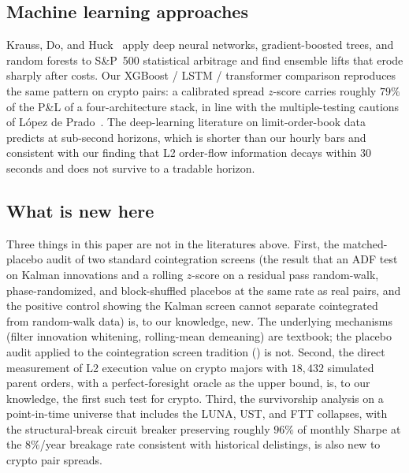\documentclass[11pt]{article}
\begin{document}
\subsection{Machine learning approaches}
\label{sec:related-ml}

Krauss, Do, and Huck~\cite{krauss2017deep} apply deep neural networks, gradient-boosted
trees, and random forests to S\&P~500 statistical arbitrage and find ensemble lifts that
erode sharply after costs. Our XGBoost / LSTM / transformer comparison reproduces the same
pattern on crypto pairs: a calibrated spread $z$-score carries roughly $79\%$ of the P\&L of
a four-architecture stack, in line with the multiple-testing cautions of L\'opez de
Prado~\cite{lopezdeprado2018advances}. The deep-learning literature on limit-order-book
data predicts at sub-second horizons, which is shorter than our hourly bars and consistent
with our finding that L2 order-flow information decays within $30$ seconds and does not
survive to a tradable horizon.

\subsection{What is new here}
\label{sec:related-novelty}

Three things in this paper are not in the literatures above. First, the matched-placebo
audit of two standard cointegration screens (the result that an ADF test on Kalman
innovations and a rolling $z$-score on a residual pass random-walk, phase-randomized, and
block-shuffled placebos at the same rate as real pairs, and the positive control showing
the Kalman screen cannot separate cointegrated from random-walk data) is, to our
knowledge, new. The underlying mechanisms (filter innovation whitening, rolling-mean
demeaning) are textbook; the placebo audit applied to the cointegration screen tradition
(\cite{vidyamurthy2004pairs, elliott2005pairs, triantafyllopoulos2011dynamic}) is not.
Second, the direct measurement of L2 execution value on crypto majors with $18{,}432$
simulated parent orders, with a perfect-foresight oracle as the upper bound, is, to our
knowledge, the first such test for crypto. Third, the survivorship analysis on a
point-in-time universe that includes the LUNA, UST, and FTT collapses, with the
structural-break circuit breaker preserving roughly $96\%$ of monthly Sharpe at the $8\%$/year
breakage rate consistent with historical delistings, is also new to crypto pair spreads.

\end{document}
